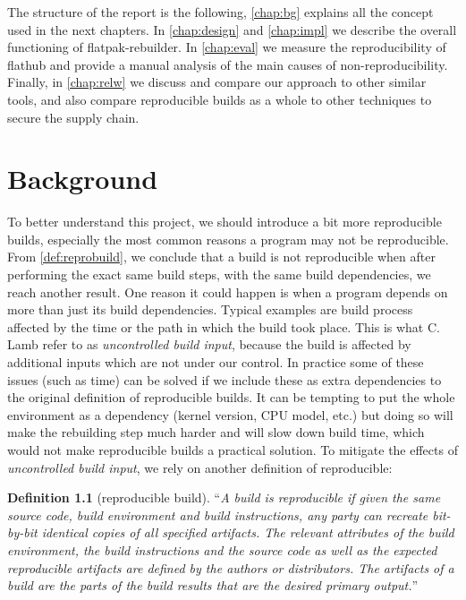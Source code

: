 \documentclass[a4paper,11pt,oneside]{report}
\theoremstyle{definition}
\newtheorem{definition}{Definition}[section]
\newcommand{\sysname}{flatpak-rebuilder\xspace}
\newcommand{\rb}{reproducible builds\xspace}
\newcommand{\fh}{flathub\xspace}
\begin{document}
The structure of the report is the following, \autoref{chap:bg} explains all
the concept used in the next chapters. In \autoref{chap:design} and
\autoref{chap:impl} we describe the overall functioning of \sysname. In
\autoref{chap:eval} we measure the reproducibility of \fh and provide a manual
analysis of the main causes of non-reproducibility. Finally, in
\autoref{chap:relw} we discuss and compare our approach to other similar tools,
and also compare \rb as a whole to other techniques to secure the supply chain.

\chapter{Background}
\label{chap:bg}

To better understand this project, we should introduce a bit more \rb,
especially the most common reasons a program may not be reproducible. From
\autoref{def:reprobuild}, we conclude that a build is not reproducible when
after performing the exact same build steps, with the same build dependencies,
we reach another result. One reason it could happen is when a program depends
on more than just its build dependencies. Typical examples are build process
affected by the time or the path in which the build took place. This is what C.
Lamb refer to as \emph{uncontrolled build input}, because the build is affected
by additional inputs which are not under our control. In practice some of these
issues (such as time) can be solved if we include these as extra dependencies
to the original definition of \rb. It can be tempting to put the whole
environment as a dependency (kernel version, CPU model, etc.) but doing so will
make the rebuilding step much harder and will slow down build time, which would
not make \rb a practical solution. To mitigate the effects of
\emph{uncontrolled build input}, we rely on another definition of reproducible:
\begin{definition}[reproducible build]
\label{def:reprobuild2}
``\emph{A build is reproducible if given the same source code, build
    environment and build instructions, any party can recreate bit-by-bit
    identical copies of all specified artifacts.
The relevant attributes of the build environment, the build instructions and
    the source code as well as the expected reproducible artifacts are defined
    by the authors or distributors. The artifacts of a build are the parts of
    the build results that are the desired primary output.}''~\cite{reprobuilds:def}
\end{definition}
\end{document}
